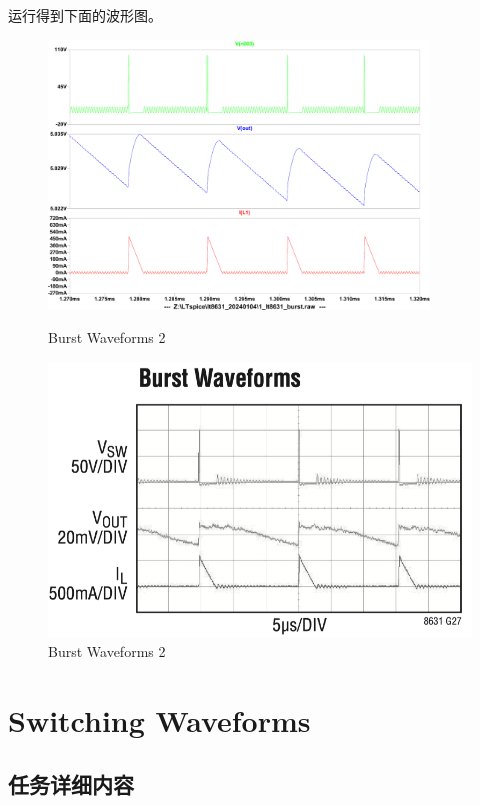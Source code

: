 \documentclass[lang=cn,10pt]{elegantbook}
\begin{document}
运行得到下面的波形图。

\begin{figure}[htbp]
    \centering\begin{minipage}[t]{0.48\textwidth}
        \centering\includegraphics[page=1, width=0.9\textwidth]{figure/1_lt8631_burst_2.pdf}
        \caption{Burst Waveforms 2}
    \end{minipage}
    \centering\begin{minipage}[t]{0.48\textwidth}
        \centering\includegraphics[width=0.9\linewidth]{figure/datasheet_G27.png}
        \caption{Burst Waveforms 2}
    \end{minipage}
\end{figure}

\section{Switching Waveforms}

\subsection{任务详细内容}
\end{document}

